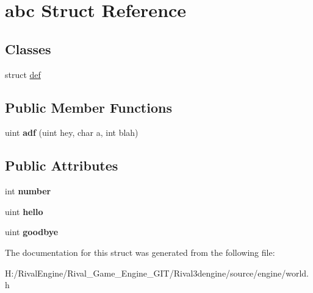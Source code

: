 \hypertarget{structabc}{}\section{abc Struct Reference}
\label{structabc}
\subsection*{Classes}
\begin{DoxyCompactItemize}
\item 
struct \hyperlink{structabc_1_1def}{def}
\end{DoxyCompactItemize}
\subsection*{Public Member Functions}
\begin{DoxyCompactItemize}
\item 
\mbox{\label{structabc_a5e69665ef36adc55c08361ade22c3b62}} 
uint {\bfseries adf} (uint hey, char a, int blah)
\end{DoxyCompactItemize}
\subsection*{Public Attributes}
\begin{DoxyCompactItemize}
\item 
\mbox{\label{structabc_a64dbc67bc705b5c905507eb624593aec}} 
int {\bfseries number}
\item 
\mbox{\label{structabc_a97b811943c0dd17f92c3337235013194}} 
uint {\bfseries hello}
\item 
\mbox{\label{structabc_a6201e4e2626bdfb519342b8216fb27aa}} 
uint {\bfseries goodbye}
\end{DoxyCompactItemize}


The documentation for this struct was generated from the following file\+:\begin{DoxyCompactItemize}
\item 
H\+:/\+Rival\+Engine/\+Rival\+\_\+\+Game\+\_\+\+Engine\+\_\+\+G\+I\+T/\+Rival3dengine/source/engine/world.\+h\end{DoxyCompactItemize}

